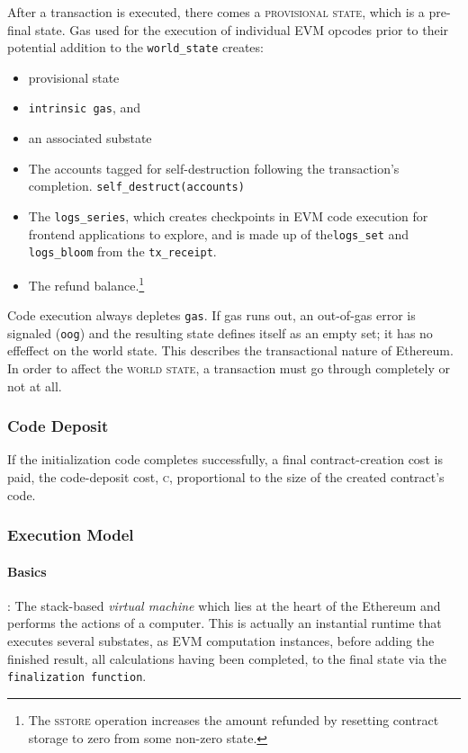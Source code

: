 \documentclass[10pt,a4paper,leqno,bibliography=totoc]{scrartcl}
\newenvironment{alphafootnotes}
{\par\edef\savedfootnotenumber{\number\value{footnote}}
\renewcommand{\thefootnote}{\alph{footnote}}
\setcounter{footnote}{0}}
{\par\setcounter{footnote}{\savedfootnotenumber}}
\begin{document}
\begin{alphafootnotes}
\begin{multicols*}{2}
			After a transaction is executed, there comes a \textsc{provisional state}, which is a pre-final state. Gas used for the execution of individual EVM opcodes prior to their potential addition to the \texttt{world\_state} creates:
			
		\begin{itemize}
			\item provisional state
			\item \texttt{intrinsic gas}, and
			\item an associated substate  
		\end{itemize}
		
		\begin{itemize}
        		\item The accounts tagged for self-destruction following the transaction's completion. \texttt{self\_destruct(accounts)}
        		\item The \texttt{logs\_series}, which creates checkpoints in EVM code execution for frontend applications to explore, and is made up of the\texttt{logs\_set} and \texttt{logs\_bloom} from the \texttt{tx\_receipt}.
			\item The refund balance.\footnote{The \textsc{sstore} operation increases the amount refunded by resetting contract storage to zero from some non-zero state.}
		\end{itemize}

		Code execution always depletes \texttt{gas}. If gas runs out, an out-of-gas error is signaled (\texttt{oog}) and the resulting state defines itself as an empty set; it has no effeffect on the world state. This describes the transactional nature of Ethereum. In order to affect the \textsc{world state}, a transaction must go through completely or not at all. 

				\subsubsection{Code Deposit}
				If the initialization code completes successfully, a final contract-creation cost is paid, the code-deposit cost, \textsc{c}, proportional to the size of the created contract's code. 
	
				\subsubsection{Execution Model}
				\paragraph{Basics}: The stack-based \textsl{virtual machine} which lies at the heart of the Ethereum and performs the actions of a computer. This is actually an instantial runtime that executes several substates, as EVM computation instances, before adding the finished result, all calculations having been completed, to the final state  via the \texttt{finalization function}. 
	

\end{multicols*}
\end{alphafootnotes}
\end{document}
